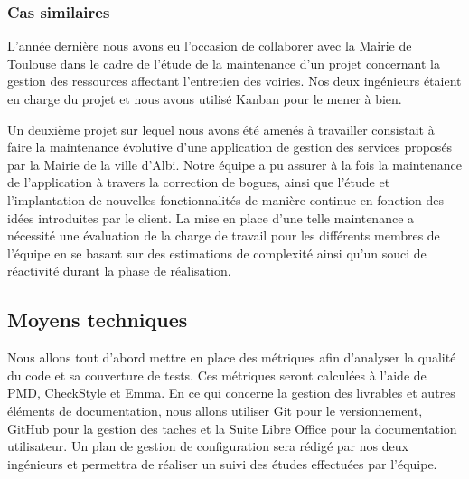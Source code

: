 		\subsubsection{Cas similaires}
		L’année dernière nous avons eu l’occasion de collaborer avec la Mairie de Toulouse dans le cadre de l’étude de la maintenance d’un projet concernant la gestion des ressources affectant l’entretien des voiries. Nos deux ingénieurs étaient en charge du projet et nous avons utilisé Kanban pour le mener à bien.
		
		Un deuxième projet sur lequel nous avons été amenés à travailler consistait à faire la maintenance évolutive d’une application de gestion des services proposés par la Mairie de la ville d’Albi. Notre équipe a pu assurer à la fois la maintenance de l’application à travers la correction de bogues, ainsi que l’étude et l'implantation de nouvelles fonctionnalités de manière continue en fonction des idées introduites par le client. La mise en place d’une telle maintenance a nécessité une évaluation de la charge de travail pour les différents membres de l’équipe en se basant sur des estimations de complexité ainsi qu’un souci de réactivité durant la phase de réalisation.
		
	\subsection{Moyens techniques}
	Nous allons tout d’abord mettre en place des métriques afin d’analyser la qualité du code et sa couverture de tests. Ces métriques seront calculées à l’aide de PMD, CheckStyle et Emma. 
	En ce qui concerne la gestion des livrables et autres éléments de documentation, nous allons utiliser Git pour le versionnement, GitHub pour la gestion des taches et la Suite Libre Office pour la documentation utilisateur. Un plan de gestion de configuration sera rédigé par nos deux ingénieurs et permettra de réaliser un suivi des études effectuées par l’équipe. 
	